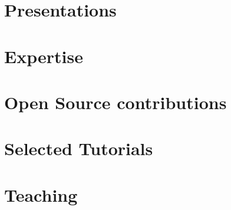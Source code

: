 \documentclass[11pt]{article} %
\begin{document}
\section*{Presentations}
\label{presentations}




\section*{Expertise}
\label{expertise}



\section*{Open Source contributions}
\label{tools}




\section*{Selected Tutorials}
\label{tutorials}



\section*{Teaching}
\label{teaching}

\end{document}
